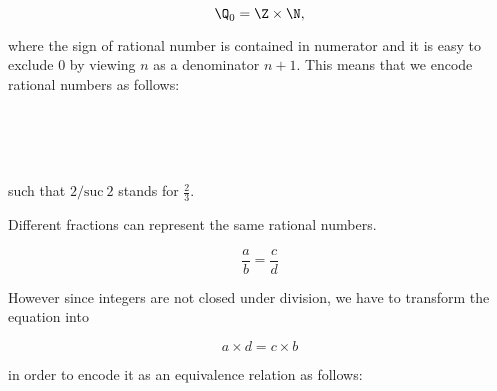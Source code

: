 $$\Q_0 = \Z \times \N,$$

where the sign of rational number is contained in numerator and it is easy to exclude $0$ by viewing $n$ as a denominator $n + 1$.
This means that we encode rational numbers as follows:

\begin{code}\>\<%
\\
\>  \AgdaSymbol{:}  \<%
\\
\>[0]\<[2]%
\>[2] \AgdaSymbol{:} \AgdaSymbol{(} \AgdaSymbol{:} \AgdaSymbol{)}  \AgdaSymbol{(} \AgdaSymbol{:} \AgdaSymbol{)}  \<%
\\
\>\<\end{code}

such that $2 /\text{suc}~ 2$ stands for $\frac{2}{3}$.




Different fractions can represent the same rational numbers.

$$ \frac{a}{b} = \frac{c}{d} $$

However since integers are not closed under division, we have to transform the equation into

$$a \times d = c \times b $$

in order to encode it as an equivalence relation as follows:

\begin{code}\>\<%
\\
\> \<[6]%
\>[6]\AgdaSymbol{:}     \<%
\\
\>       \AgdaSymbol{=} \<[27]%
\>[27]  \AgdaSymbol{(}\AgdaInductiveConstructor{+}  \AgdaSymbol{)}    \AgdaSymbol{(}\AgdaInductiveConstructor{+}  \AgdaSymbol{)}\<%
\\
\>\<\end{code}

